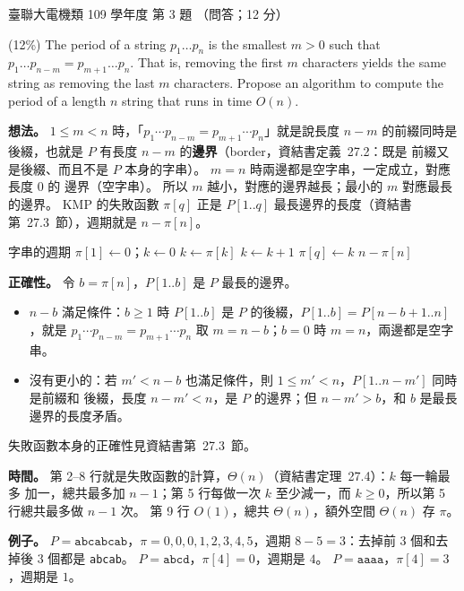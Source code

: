 \begin{pastexam}[label={px:ust-109-ee-ds-03}]{臺聯大電機類 109 學年度 第 3 題}
（問答；12 分）

(12\%) The period of a string $p_1 \ldots p_n$ is the smallest $m > 0$ such that
$p_1 \ldots p_{n-m} = p_{m+1} \ldots p_n$. That is, removing the first $m$ characters yields the same
string as removing the last $m$ characters. Propose an algorithm to compute the period of a length $n$
string that runs in time $O(n)$.
\end{pastexam}

\begin{pastsoln}
\textbf{想法。} $1 \le m < n$ 時，「$p_1 \cdots p_{n-m} = p_{m+1} \cdots p_n$」就是說長度 $n - m$
的前綴同時是後綴，也就是 $P$ 有長度 $n - m$ 的\textbf{邊界}（border，資結書定義~27.2：既是
前綴又是後綴、而且不是 $P$ 本身的字串）。 $m = n$ 時兩邊都是空字串，一定成立，對應長度 $0$ 的
邊界（空字串）。 所以 $m$ 越小，對應的邊界越長；最小的 $m$ 對應最長的邊界。 KMP 的失敗函數
$\pi[q]$ 正是 $P[1..q]$ 最長邊界的長度（資結書第~27.3~節），週期就是 $n - \pi[n]$。

\begin{pseudo}{字串的週期}
    \State $\pi[1] \gets 0$；$k \gets 0$ 
            \State $k \gets \pi[k]$ 
        \EndWhile
            \State $k \gets k + 1$
        \EndIf
        \State $\pi[q] \gets k$
    \EndFor
    \State \Return $n - \pi[n]$
\EndFunction
\end{pseudo}

\textbf{正確性。} 令 $b = \pi[n]$，$P[1..b]$ 是 $P$ 最長的邊界。
\begin{itemize}
\item $n - b$ 滿足條件：$b \ge 1$ 時 $P[1..b]$ 是 $P$ 的後綴，$P[1..b] = P[n - b + 1 .. n]$，就是
$p_1 \cdots p_{n-m} = p_{m+1} \cdots p_n$ 取 $m = n - b$；$b = 0$ 時 $m = n$，兩邊都是空字串。
\item 沒有更小的：若 $m' < n - b$ 也滿足條件，則 $1 \le m' < n$，$P[1..n - m']$ 同時是前綴和
後綴，長度 $n - m' < n$，是 $P$ 的邊界；但 $n - m' > b$，和 $b$ 是最長邊界的長度矛盾。
\end{itemize}
失敗函數本身的正確性見資結書第~27.3~節。

\textbf{時間。} 第 2--8 行就是失敗函數的計算，$\Theta(n)$（資結書定理~27.4）：$k$ 每一輪最多
加一，總共最多加 $n - 1$；第 5 行每做一次 $k$ 至少減一，而 $k \ge 0$，所以第 5 行總共最多做
$n - 1$ 次。 第 9 行 $O(1)$，總共 $\Theta(n)$，額外空間 $\Theta(n)$ 存 $\pi$。

\textbf{例子。} $P = \mathtt{abcabcab}$，$\pi = 0, 0, 0, 1, 2, 3, 4, 5$，週期 $8 - 5 = 3$：去掉前 $3$
個和去掉後 $3$ 個都是 \texttt{abcab}。 $P = \mathtt{abcd}$，$\pi[4] = 0$，週期是 $4$。
$P = \mathtt{aaaa}$，$\pi[4] = 3$，週期是 $1$。
\end{pastsoln}
